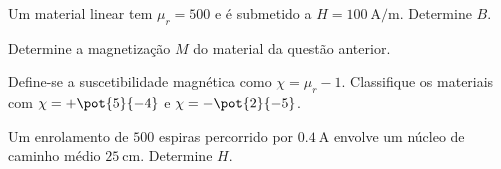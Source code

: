 \blocofixacao
\begin{questao}[1]{}

Um material linear tem $\mu_r=500$ e é submetido a
$H=\SI{100}{\ampere\per\meter}$. Determine $B$.


\end{questao}
\begin{questao}[1]{}

Determine a magnetização $M$ do material da questão anterior.


\end{questao}
\begin{questao}[1]{}

Define-se a suscetibilidade magnética como $\chi=\mu_r-1$. Classifique os
materiais com $\chi=+\pot{5}{-4}$ e $\chi=-\pot{2}{-5}$.


\end{questao}
\begin{questao}[1]{}

Um enrolamento de $500$ espiras percorrido por $\SI{0.4}{\ampere}$ envolve um
núcleo de caminho médio $\SI{25}{\centi\meter}$. Determine $H$.


\end{questao}

